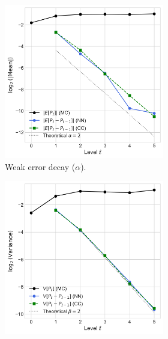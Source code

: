 \begin{figure}[htbp]
    \centering
    \begin{subfigure}{\textwidth}
        \centering
        \begin{subfigure}[b]{0.48\textwidth}
            \centering
            \includegraphics[width=\linewidth]{graphics/dk_err_decay.png}
            \caption{Weak error decay ($\alpha$).}
            \label{fig:dk_error_decay}
        \end{subfigure}
        \hfill
        \begin{subfigure}[b]{0.48\textwidth}
            \centering
            \includegraphics[width=\linewidth]{graphics/dk_var_decay.png}

\end{subfigure}
\end{subfigure}
\end{figure}
